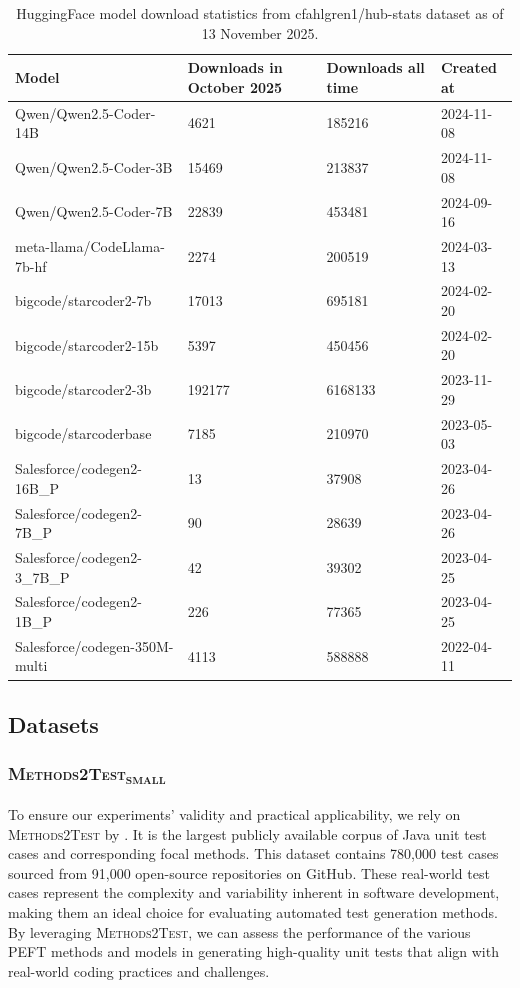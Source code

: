 \documentclass[12pt]{book}
\begin{document}
\begin{table}[htbp]
    \centering
    \caption{HuggingFace model download statistics from cfahlgren1/hub-stats dataset as of 13 November 2025.}
    \label{tab:model-downloads}
    \small
    \begin{tabularx}{\columnwidth}{lRRY}
    \toprule
    \textbf{Model} & \textbf{Downloads in October 2025} & \textbf{Downloads all time} & \textbf{Created at} \\
    \midrule
    Qwen/Qwen2.5-Coder-14B & 4621 & 185216 & 2024-11-08 \\
    Qwen/Qwen2.5-Coder-3B & 15469 & 213837 & 2024-11-08 \\
    Qwen/Qwen2.5-Coder-7B & 22839 & 453481 & 2024-09-16 \\
    meta-llama/CodeLlama-7b-hf & 2274 & 200519 & 2024-03-13 \\
    bigcode/starcoder2-7b & 17013 & 695181 & 2024-02-20 \\
    bigcode/starcoder2-15b & 5397 & 450456 & 2024-02-20 \\
    bigcode/starcoder2-3b & 192177 & 6168133 & 2023-11-29 \\
    bigcode/starcoderbase & 7185 & 210970 & 2023-05-03 \\
    Salesforce/codegen2-16B\_P & 13 & 37908 & 2023-04-26 \\
    Salesforce/codegen2-7B\_P & 90 & 28639 & 2023-04-26 \\
    Salesforce/codegen2-3\_7B\_P & 42 & 39302 & 2023-04-25 \\
    Salesforce/codegen2-1B\_P & 226 & 77365 & 2023-04-25 \\
    Salesforce/codegen-350M-multi & 4113 & 588888 & 2022-04-11 \\
    \bottomrule
    \end{tabularx}
\end{table}

\subsection{Datasets}
\label{sec:dataset}
\subsubsection{\textsc{Methods2Test\textsubscript{small}}}
To ensure our experiments' validity and practical applicability, we rely on \textsc{Methods2Test} by \citet{tufano2021unit}. It is the largest publicly available corpus of Java unit test cases and corresponding focal methods. This dataset contains 780,000 test cases sourced from 91,000 open-source repositories on GitHub. These real-world test cases represent the complexity and variability inherent in software development, making them an ideal choice for evaluating automated test generation methods. By leveraging \textsc{Methods2Test}, we can assess the performance of the various PEFT methods and models in generating high-quality unit tests that align with real-world coding practices and challenges.
\end{document}
